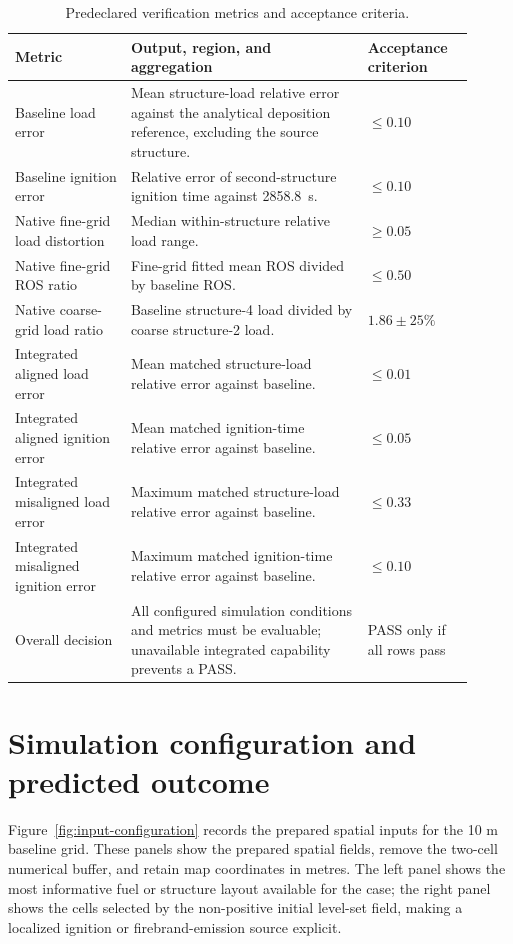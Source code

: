 \begin{table}[H]
\centering
\footnotesize
\caption{Predeclared verification metrics and acceptance criteria.}
\label{tab:acceptance-contract}
\begin{tabular}{@{}p{0.23\linewidth}p{0.47\linewidth}p{0.21\linewidth}@{}}
\toprule
Metric & Output, region, and aggregation & Acceptance criterion\\
\midrule
Baseline load error & Mean structure-load relative error against the analytical deposition reference, excluding the source structure. & \(\le0.10\) \\
Baseline ignition error & Relative error of second-structure ignition time against \SI{2858.8}{s}. & \(\le0.10\) \\
Native fine-grid load distortion & Median within-structure relative load range. & \(\ge0.05\) \\
Native fine-grid ROS ratio & Fine-grid fitted mean ROS divided by baseline ROS. & \(\le0.50\) \\
Native coarse-grid load ratio & Baseline structure-4 load divided by coarse structure-2 load. & \(1.86\pm25\%\) \\
Integrated aligned load error & Mean matched structure-load relative error against baseline. & \(\le0.01\) \\
Integrated aligned ignition error & Mean matched ignition-time relative error against baseline. & \(\le0.05\) \\
Integrated misaligned load error & Maximum matched structure-load relative error against baseline. & \(\le0.33\) \\
Integrated misaligned ignition error & Maximum matched ignition-time relative error against baseline. & \(\le0.10\) \\
Overall decision & All configured simulation conditions and metrics must be evaluable; unavailable integrated capability prevents a PASS. & PASS only if all rows pass \\
\bottomrule
\end{tabular}
\end{table}

\section{Simulation configuration and predicted outcome}

Figure~\ref{fig:input-configuration} records the prepared spatial inputs for the 10 m baseline grid.
These panels show the prepared spatial fields, remove the
two-cell numerical buffer, and retain map coordinates in metres.  The left panel shows
the most informative fuel or structure layout available for the case; the right panel
shows the cells selected by the non-positive initial level-set field, making a localized
ignition or firebrand-emission source explicit.

